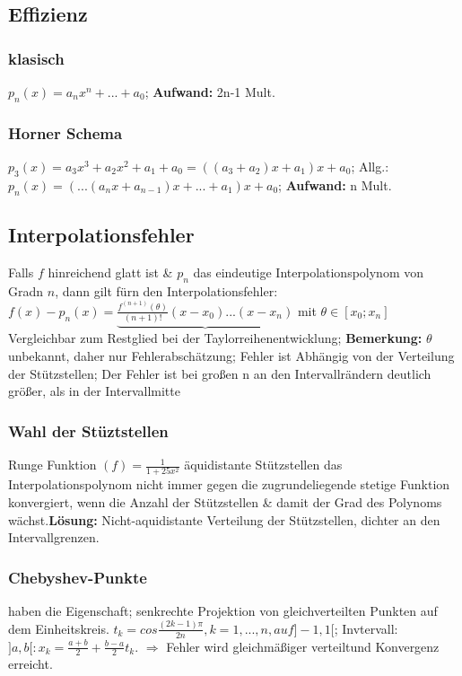 \subsection{Effizienz}
\subsubsection{klasisch}
$ p_{n} (x) = a_{n} x^{n} + ... + a_{0} $; 
\textbf{Aufwand:} 2n-1 Mult.
\subsubsection{Horner Schema}
$ p_{3} (x) = a_{3} x^{3} + a_{2} x^{2} + a_{1} + a_{0} = (( a_{3} + a_{2} ) x + a_{1} )x+ a_{0} $; 
Allg.: $ p_{n} (x) = ( ... ( a_{n} x + a_{n-1} ) x + ... + a_{1} ) x + a_{0} $; 
\textbf{Aufwand:} n Mult.

\subsection{Interpolationsfehler}
Falls $ f $ hinreichend glatt ist \& $ p_{n} $ das eindeutige Interpolationspolynom von Gradn $ n $, dann gilt fürn den Interpolationsfehler:
$ f(x) - p_{n}(x) = \underbrace{ \frac{ f^{ ( n+1 ) }( \theta ) }{ ( n+1) ! } ( x-x_{0} )...( x-x_{n} ) } $ mit $ \theta \in [ x_{0}; x_{n} ]  $\\
Vergleichbar zum Restglied bei der Taylorreihenentwicklung; 
\textbf{Bemerkung:} $ \theta $ unbekannt, daher nur Fehlerabschätzung; 
Fehler ist Abhängig von der Verteilung der Stützstellen; 
Der Fehler ist bei großen n an den Intervallrändern deutlich größer, als in der Intervallmitte
\subsubsection{Wahl der Stüztstellen}
Runge Funktion $ (f) = \frac{ 1 }{ 1+25x^{2} } $ äquidistante Stützstellen das Interpolationspolynom nicht immer gegen die zugrundeliegende stetige Funktion konvergiert, wenn die Anzahl der Stützstellen \& damit der Grad des Polynoms wächst.\textbf{Lösung:}  Nicht-aquidistante Verteilung der Stützstellen, dichter an den Intervallgrenzen.
\subsubsection{Chebyshev-Punkte}
haben die Eigenschaft; senkrechte Projektion von gleichverteilten Punkten auf dem Einheitskreis. $ t_{k} = cos\frac{ ( 2k-1 ) \pi }{ 2n }, k=1,...,n, auf ]-1,1[ $;  Invtervall: $ ]a,b[: x_{k} = \frac{ a +b }{2} + \frac{ b-a }{ 2 } t_{k} $. $\Rightarrow$ Fehler wird gleichmäßiger verteiltund Konvergenz erreicht.
